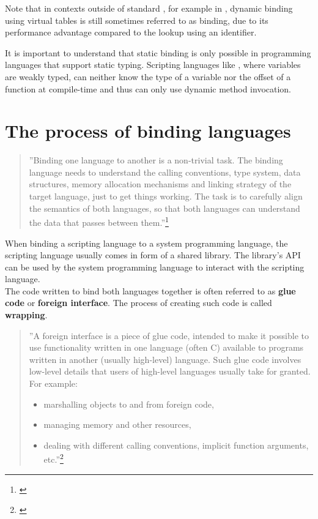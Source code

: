 Note that in contexts outside of standard , for example in , dynamic binding using virtual tables is still sometimes referred to as  binding, due to its performance advantage compared to the lookup using an identifier.

It is important to understand that static binding is only possible in programming languages that support static typing. Scripting languages like , where variables are weakly typed, can neither know the type of a variable nor the offset of a function at compile-time and thus can only use dynamic method invocation.

\section{The process of binding languages}

\begin{quotation}
''Binding one language to another is a non-trivial task. The binding language needs to understand the calling conventions, type system, data structures, memory allocation mechanisms and linking strategy of the target language, just to get things working. The task is to carefully align the semantics of both languages, so that both languages can understand the data that passes between them.''\footnote{\citep{RealWorldHaskell}}
\end{quotation}

When binding a scripting language to a system programming language, the scripting language usually comes in form of a shared library. The library's API can be used by the system programming language to interact with the scripting language.\\
The code written to bind both languages together is often referred to as \textbf{glue code} or \textbf{foreign interface}. The process of creating such code is called \textbf{wrapping}.

\begin{quotation}
''A foreign interface is a piece of glue code, intended to make it possible to use functionality written in one language (often C) available to programs written in another (usually high-level) language. Such glue code involves low-level details that users of high-level languages usually take for granted. For example:
\begin{itemize}
\item marshalling objects to and from foreign code,
\item managing memory and other resources,
\item dealing with different calling conventions, implicit function arguments, etc.''\footnote{\citep{FFIScheme}}
\end{itemize}
\end{quotation}

